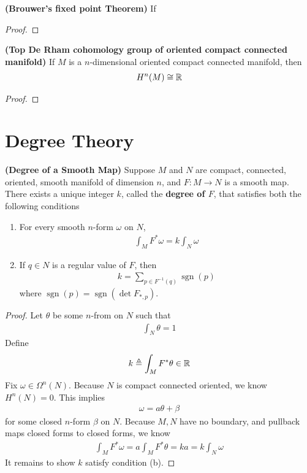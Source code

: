 \documentclass{report}
\begin{document}
\begin{theorem}
\textbf{(Brouwer's fixed point Theorem)} If 
\end{theorem}
\begin{proof}

\end{proof}
\begin{theorem}
\textbf{(Top De Rham cohomology group of oriented compact connected manifold)} If $M$ is a $n$-dimensional oriented compact connected manifold, then 
 \begin{align*}
H^n(M)\cong  \mathbb{R}
\end{align*}
\end{theorem}
\begin{proof}

\end{proof}
\section{Degree Theory}
\begin{theorem}
\textbf{(Degree of a Smooth Map)} Suppose $M$ and  $N$ are compact, connected, oriented, smooth manifold of dimension  $n$, and  $F:M\rightarrow N$ is a smooth map. There exists a unique integer $k$, called the  \textbf{degree of $F$}, that satisfies both the following conditions 
\begin{enumerate}[label=(\alph*)]
  \item For every smooth $n$-form  $\omega$ on $N$, 
     \begin{align*}
    \int_M F^* \omega= k \int_N \omega
    \end{align*} 
  \item If $q \in N$ is a regular value of $F$, then 
     \begin{align*}
    k= \sum_{p \in F^{-1}(q)}\operatorname{sgn}(p)
    \end{align*}
  where $\operatorname{sgn}(p)=\operatorname{sgn}(\operatorname{det}F_{*,p})$. 
\end{enumerate}
\end{theorem}
\begin{proof}
Let $\theta$ be some $n$-from on  $N$ such that 
 \begin{align*}
\int_N \theta =1
\end{align*}
Define 
\begin{align*}
k\triangleq \int_M F^* \theta\in\mathbb{R}
\end{align*}
Fix $\omega \in \Omega^n (N)$. Because $N$ is compact connected oriented, we know  $H^n(N)=0$. This implies 
\begin{align*}
\omega= a \theta  + \beta 
\end{align*}
for some closed $n$-form  $\beta $ on $N$. Because $M,N$ have no  boundary, and pullback maps closed forms to closed forms, we know 
\begin{align*}
\int_M F^* \omega= a\int_M F^* \theta =  k a= k \int_N \omega
\end{align*}
It remains to show $k$ satisfy condition  (b). 
\end{proof}
\end{document}
